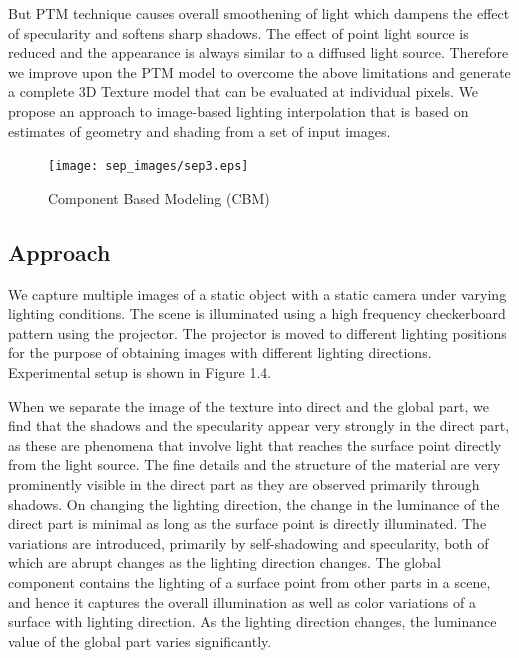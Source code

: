 But PTM technique causes overall smoothening of light which dampens the effect
of specularity and softens sharp shadows. The effect of point light source is
reduced and the appearance is always similar to a diffused light source.
Therefore we improve upon the PTM model
to overcome the above limitations
and generate a complete 3D Texture model that can be evaluated at individual
pixels. We propose an approach to image-based lighting interpolation that is
based on estimates of geometry and shading from a set of input images.

\begin{figure}[t]
\centering
\texttt{[image: sep\_images/sep3.eps]}

\caption{Component Based Modeling (CBM)}
\label{fig:CBM}
\end{figure}

\subsection{Approach}
We capture multiple images of a static object with a static camera under varying
lighting conditions.
The scene is
illuminated using a high frequency checkerboard pattern using the projector. The
projector is moved to different lighting positions for the purpose of obtaining
images with different lighting directions. Experimental setup is shown in Figure 1.4.

When we separate the image of the texture into direct and the global part, we find
that the shadows and the specularity appear very strongly in the direct part,
as these are phenomena that involve light that reaches the surface point
directly from the light source. The fine details and the structure of the
material are very prominently visible in the direct part as they are observed
primarily through shadows. On changing the lighting direction, the change in the
luminance of the direct part is minimal as long as the surface point is directly
illuminated. The variations are introduced, primarily by self-shadowing and
specularity, both of which are abrupt changes as the lighting direction changes.
The global component contains the lighting of a surface point from other
parts in a scene, and hence it captures the overall illumination as well as
color variations of a surface with lighting direction. As the lighting direction
changes, the luminance value of the global part varies significantly.

